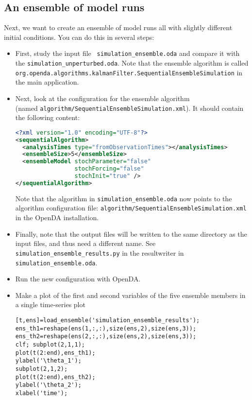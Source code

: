 \subsection{An ensemble of model runs}
Next, we want to create an ensemble of model runs all with slightly different initial conditions. 
      You can do this in several steps:
      \begin{itemize}
      \item First, study the input file \texttt{ simulation\_ensemble.oda} and compare it with the
            \texttt{simulation\_unperturbed.oda}. Note that the ensemble algorithm is called
            \verb|org.openda.algorithms.kalmanFilter.SequentialEnsembleSimulation| in the main application.
      \item Next, look at the configuration for the ensemble algorithm \\
      (named \texttt{algorithm/SequentialEnsembleSimulation.xml}). It should contain the following content:
\begin{lstlisting}[language=XML,frame=single,caption={XML input for sequentialAlgorithm}]
<?xml version="1.0" encoding="UTF-8"?>
<sequentialAlgorithm>
  <analysisTimes type="fromObservationTimes"></analysisTimes>
  <ensembleSize>5</ensembleSize>
  <ensembleModel stochParameter="false"
                 stochForcing="false"
                 stochInit="true" />
</sequentialAlgorithm>

\end{lstlisting}
      Note that the algorithm in \texttt{simulation\_ensemble.oda} now points to the algorithm configuration file:
      \texttt{algorithm/SequentialEnsembleSimulation.xml} in the OpenDA installation.
      \item Finally, note that the output files will be written to the same directory as the input files, and thus need a different name.
      See \texttt{simulation\_ensemble\_results.py} in the resultwriter in \texttt{simulation\_ensemble.oda}.
      \item Run the new configuration with OpenDA.

      \item Make a plot of the first and second variables of the five ensemble
      members in a single time-series plot
\ifshowmatlab
\begin{lstlisting}[style=MatlabStyle,frame=single,caption={Matlab}]
[t,ens]=load_ensemble('simulation_ensemble_results');
ens_th1=reshape(ens(1,:,:),size(ens,2),size(ens,3));
ens_th2=reshape(ens(2,:,:),size(ens,2),size(ens,3));
clf; subplot(2,1,1);
plot(t(2:end),ens_th1);
ylabel('\theta_1');
subplot(2,1,2);
plot(t(2:end),ens_th2);
ylabel('\theta_2');
xlabel('time');\end{lstlisting}
\fi
     

\end{itemize}
